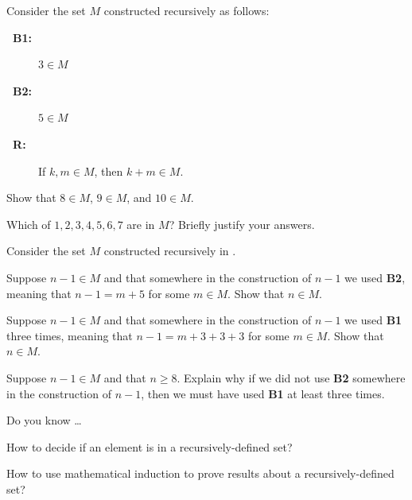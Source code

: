 \begin{exer}[\exerP] %
\label{exer_coins_3and5_set}
    Consider the set $M$ constructed recursively as follows:      
        \begin{description}
            \item [\textbf{~\quad B1:}] $3 \in M$
            \item [\textbf{~\quad B2:}] $5 \in M$
            \item [\textbf{~\quad R:}] If $k,m \in M$, then $k+m \in M$.
        \end{description} 
        \begin{exerpart}
             \item Show that $8 \in M$, $9 \in M$, and $10 \in M$.
             \item Which of $1, 2, 3, 4, 5, 6, 7$ are in $M$?  Briefly justify your answers.        
         \end{exerpart}
\end{exer}

\begin{exer}[\exerU] %
\label{exer_coins_3and5_add1}
    Consider the set $M$ constructed recursively in .
         \begin{exerpart}
             \item \label{part_3and5_trade5_for6} Suppose $n-1 \in M$ and that somewhere in the construction of $n-1$ we used \textbf{B2}, meaning that $n-1=m+5$ for some $m \in M$.  Show that $n \in M$.
             \item \label{part_3and5_trade9_for10} Suppose $n-1 \in M$ and that somewhere in the construction of $n-1$ we used \textbf{B1} three times, meaning that $n-1 = m+3+3+3$ for some $m \in M$.  Show that $n \in M$. 
             \item \label{part_3and5_cases} Suppose $n-1 \in M$ and that $n \ge 8$.  Explain why if we did not use \textbf{B2} somewhere in the construction of $n-1$, then we must have used \textbf{B1} at least three times. 
         \end{exerpart}
\end{exer}

\begin{exer}[\exerR] %
\label{exer_dyk_rec_def_sets}
    Do you know \ldots
        \begin{exerpart}
            \item How to decide if an element is in a recursively-defined set?
            \item How to use mathematical induction to prove results about a recursively-defined set?
        \end{exerpart}
\end{exer}


